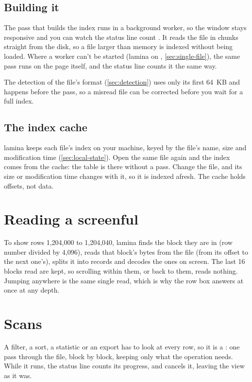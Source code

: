 \subsection{Building it}

The pass that builds the index runs in a background worker, so the window stays responsive and you can
watch the status line count . It reads the file in chunks straight from the disk, so
a file larger than memory is indexed without being loaded. Where a worker can't be started (lamina on
, \cref{sec:single-file}), the same pass runs on the page itself, and the status line
counts it the same way.

The detection of the file's format (\cref{sec:detection}) uses only its first 64~KB and happens before
the pass, so a misread file can be corrected before you wait for a full index.

\subsection{The index cache}\label{sec:index-cache}

lamina keeps each file's index on your machine, keyed by the file's name, size and modification time
(\cref{sec:local-state}). Open the same file again and the index comes from the cache: the table is
there without a pass. Change the file, and its size or modification time changes with it, so it is
indexed afresh. The cache holds offsets, not data.

\section{Reading a screenful}\label{sec:screenful}

To show rows 1{,}204{,}000 to 1{,}204{,}040, lamina finds the block they are in (row number divided by
4{,}096), reads that block's bytes from the file (from its offset to the next one's), splits it into
records and decodes the ones on screen. The last 16 blocks read are kept, so scrolling within them, or
back to them, reads nothing. Jumping anywhere is the same single read, which is why the row box answers
at once at any depth.

\section{Scans}\label{sec:scans}

A filter, a sort, a statistic or an export has to look at every row, so it is a : one pass
through the file, block by block, keeping only what the operation needs. While it runs, the status line
counts its progress, and  cancels it, leaving the view as it was.

